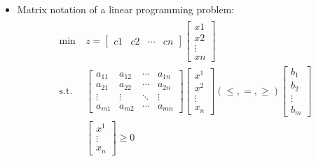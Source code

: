 \documentclass[english]{article}
\begin{document}
\begin{itemize}
  \item Matrix notation of a linear programming problem:
        \begin{gather}
          \begin{aligned}
            \min \         & z = \begin{bmatrix}
                                   c1 & c2 & \cdots & cn
                                 \end{bmatrix}
            \begin{bmatrix}
              x1     \\
              x2     \\
              \vdots \\
              xn
            \end{bmatrix}                                              \\
            \text{s.t.} \  & \begin{bmatrix}
                               a_{11} & a_{12} & \cdots & a_{1n} \\
                               a_{21} & a_{22} & \cdots & a_{2n} \\
                               \vdots & \vdots & \ddots & \vdots \\
                               a_{m1} & a_{m2} & \cdots & a_{mn}
                             \end{bmatrix}
            \begin{bmatrix}
              x^1    \\
              x^2    \\
              \vdots \\
              x_n
            \end{bmatrix} \left( \leq, =, \geq \right) \begin{bmatrix}
                                                         b_1    \\
                                                         b_2    \\
                                                         \vdots \\
                                                         b_m
                                                       \end{bmatrix}   \\
                           & \begin{bmatrix}
                               x^1 \\ \vdots \\ x_n
                             \end{bmatrix}
            \geq 0
          \end{aligned}
        \end{gather}
\end{itemize}
\end{document}
